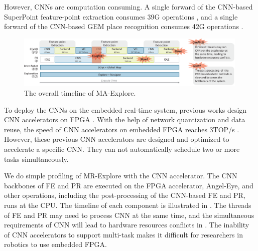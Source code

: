 However, CNNs are computation consuming. A single forward of the CNN-based SuperPoint \cite{detone2018superpoint} feature-point extraction consumes 39G operations \cite{detone2018superpoint}, and a single forward of the CNN-based GEM \cite{radenovic2018fine} place recognition consumes 42G operations \cite{radenovic2018fine}.


\begin{figure}[t]
    \centering
	\includegraphics[width=0.99\textwidth]{fig/overalltime.eps} 	
    \caption{
    The overall timeline of MA-Explore.
    }
	\label{fig:overalltime}
\end{figure}


To deploy the CNNs on the embedded real-time system, previous works design CNN accelerators on FPGA \cite{guo2017angel,yu2018instruction,li_high_2016,qiu2016going,lu_evaluating_2017}. With the help of network quantization and data reuse, the speed of CNN accelerators on embedded FPGA reaches 3TOP/s \cite{lu_evaluating_2017}.
However, these previous CNN accelerators are designed and optimized to accelerate a specific CNN. They can not automatically schedule two or more tasks simultaneously. 


We do simple profiling of MR-Explore with the CNN accelerator. The CNN backbones of FE and  PR are executed on the FPGA accelerator, Angel-Eye\cite{guo2017angel}, and other operations, including the post-processing of the CNN-based FE and PR, runs at the CPU. The timeline of each component is illustrated in . 
The threads of FE and PR may need to process CNN at the same time,  and the simultaneous requirements of CNN will lead to hardware resources conflicts in . The inability of CNN accelerators to support multi-task makes it difficult for researchers in robotics to use embedded FPGA.

